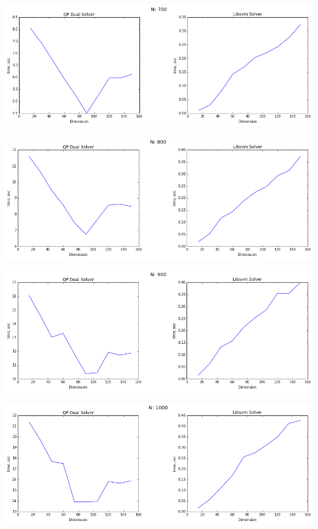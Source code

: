 \documentclass[12pt, a4paper]{article}
\begin{document}
			\begin{center}
				\includegraphics[width=18cm]{2par_N700.png}
			\end{center}

			\begin{center}
				\includegraphics[width=18cm]{2par_N800.png}
			\end{center}

			\begin{center}
				\includegraphics[width=18cm]{2par_N900.png}
			\end{center}

			\begin{center}
				\includegraphics[width=18cm]{2par_N1000.png}
			\end{center}
\end{document}
